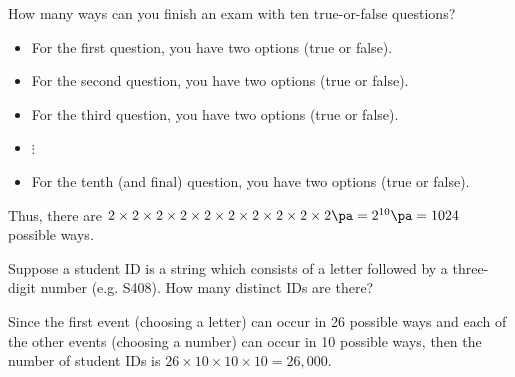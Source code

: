 \begin{frame}
\end{frame}


\begin{frame}[t]
\begin{ex}
How many ways can you finish an exam with ten true-or-false questions?
\end{ex}
\begin{sol}
\begin{itemize}
\item For the first question, you have two options (true or false). \pa
\item For the second question, you have two options (true or false). \pa
\item For the third question, you have two options (true or false). \pa
\item $\vdots$
\item For the tenth (and final) question, you have two options (true or false).
\end{itemize}
Thus, there are $2 \times 2 \times 2 \times 2 \times 2 \times 2 \times 2 \times 2 \times 2 \times 2 \pa = 2^{10} \pa = 1024$ possible ways.
\end{sol}
\end{frame}

\begin{frame}[t]
\begin{ex}
Suppose a student ID is a string which consists of a letter followed by a three-digit number (e.g. S408). How many distinct IDs are there?
\end{ex}
\begin{sol}
Since the first event (choosing a letter) can occur in 26 possible ways and each of the other events (choosing a number) can occur in 10 possible ways, then the number of student IDs is $26 \times 10 \times 10 \times 10 = 26,000$.
\end{sol}
\end{frame}



